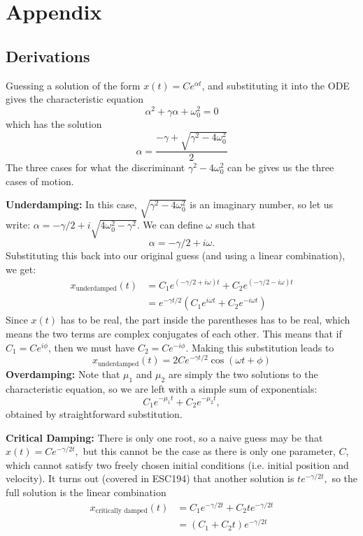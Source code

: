 \documentclass{article}
\begin{document}
\newpage
\section{Appendix}
\subsection{Derivations}
Guessing a solution of the form $x(t)=Ce^{\alpha t}$, and substituting it into the ODE gives the characteristic equation 
\begin{equation}
    \alpha^2 + \gamma \alpha + \omega_0^2 = 0
\end{equation}
which has the solution 
\begin{equation}
    \alpha = \frac{-\gamma + \sqrt{\gamma^2 - 4\omega_0^2}}{2}
\end{equation}
The three cases for what the discriminant $\gamma^2-4\omega_0^2$ can be gives us the three cases of motion.

\textbf{Underdamping:} In this case, $\sqrt{\gamma^2-4\omega_0^2}$ is an imaginary number, so let us write: $\alpha = -\gamma/2 + i\sqrt{4\omega_0^2-\gamma^2}$. We can define $\omega$ such that 
\begin{equation}
    \alpha = -\gamma/2 + i\omega.
\end{equation}
Substituting this back into our original guess (and using a linear combination), we get: 
\begin{align}
    x_\text{underdamped}(t) &= C_1e^{(-\gamma/2 + i\omega)t}+C_2e^{(-\gamma/2 - i\omega)t} \\ 
    &= e^{-\gamma t/2}\left(C_1e^{i\omega t} + C_2e^{-i\omega t}\right)
\end{align}
Since $x(t)$ has to be real, the part inside the parentheses has to be real, which means the two terms are complex conjugates of each other. This means that if $C_1=Ce^{i\phi}$, then we must have $C_2 =Ce^{-i\phi}$. Making this substitution leads to 
\begin{equation}
    x_\text{underdamped}(t) = 2Ce^{-\gamma t/2}\cos(\omega t+\phi)
\end{equation}
\textbf{Overdamping:} Note that $\mu_1$ and $\mu_2$ are simply the two solutions to the characteristic equation, so we are left with a simple sum of exponentials: 
\begin{equation}
    C_1e^{-\mu_1 t} + C_2e^{-\mu_2 t},
\end{equation}
obtained by straightforward substitution.

\textbf{Critical Damping:} There is only one root, so a naive guess may be that $x(t) = Ce^{-\gamma/2 t},$ but this cannot be the case as there is only one parameter, $C$, which cannot satisfy two freely chosen initial conditions (i.e. initial position and velocity). It turns out (covered in ESC194) that another solution is $te^{-\gamma/2 t},$ so the full solution is the linear combination 
\begin{align}
    x_\text{critically damped}(t) &= C_1e^{-\gamma/2 t} + C_2te^{-\gamma/2 t} \\ 
    &= (C_1+C_2t)e^{-\gamma/2 t}
\end{align}
\end{document}
